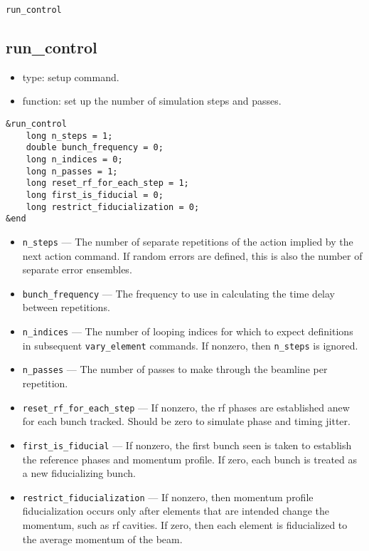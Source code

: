 \documentclass[11pt]{article}
\begin{document}
\begin{latexonly}
\newpage
\begin{center}{\Large\verb|run_control|}\end{center}
\end{latexonly}
\subsection{run\_control}

\begin{itemize}
\item type: setup command.
\item function: set up the number of simulation steps and passes.
\end{itemize}

\begin{verbatim}
&run_control
    long n_steps = 1;
    double bunch_frequency = 0;
    long n_indices = 0;
    long n_passes = 1;
    long reset_rf_for_each_step = 1;
    long first_is_fiducial = 0;
    long restrict_fiducialization = 0;
&end
\end{verbatim}

\begin{itemize}
\item \verb|n_steps| --- The number of separate repetitions of the action implied by the next action command.
If random errors are defined, this is also the number of separate error ensembles.
\item \verb|bunch_frequency| --- The frequency to use in calculating the time delay between repetitions.
\item \verb|n_indices| --- The number of looping indices for which to expect definitions in subsequent \verb|vary_element| commands.  If nonzero, then \verb|n_steps| is ignored.
\item \verb|n_passes| --- The number of passes to make through the beamline per repetition.
\item \verb|reset_rf_for_each_step| --- If nonzero, the rf phases are 
established anew for each bunch tracked.  Should be zero to simulate
phase and timing jitter. 
\item \verb|first_is_fiducial| --- If nonzero, the first bunch seen is taken
to establish the reference phases and momentum profile.  If zero, each bunch
is treated as a new fiducializing bunch.
\item \verb|restrict_fiducialization| --- If nonzero, then  momentum profile
fiducialization occurs only after elements that are intended
change the momentum, such as rf cavities.  If zero, then each element is
fiducialized to the average momentum of the beam.
\end{itemize}
\end{document}
